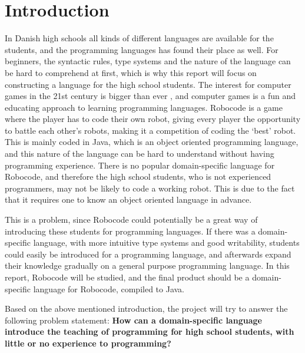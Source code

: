 \chapter{Introduction}

In Danish high schools all kinds of different languages are available for the students, and the programming languages has found their place as well. For beginners, the syntactic rules, type systems and the nature of the language can be hard to comprehend at first, which is why this report will focus on constructing a language for the high school students. The interest for computer games in the 21st century is bigger than ever \citep{Wankel}, and computer games is a fun and educating approach to learning programming languages. Robocode is a game where the player has to code their own robot, giving every player the opportunity to battle each other’s robots, making it a competition of coding the ‘best’ robot. This is mainly coded in Java, which is an object oriented programming language, and this nature of the language can be hard to understand without having programming experience. There is no popular domain-specific language for Robocode, and therefore the high school students, who is not experienced programmers, may not be likely to code a working robot. This is due to the fact that it requires one to know an object oriented language in advance. 

This is a problem, since Robocode could potentially be a great way of introducing these students for programming languages. If there was a domain-specific language, with more intuitive type systems and good writability, students could easily be introduced for a programming language, and afterwards expand their knowledge gradually on a general purpose programming language. In this report, Robocode will be studied, and the final product should be a domain-specific language for Robocode, compiled to Java.
	
Based on the above mentioned introduction, the project will try to answer the following problem statement: 
\textbf{How can a domain-specific language introduce the teaching of programming for high school students, with little or no experience to programming?} 